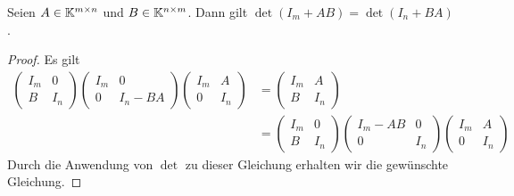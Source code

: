 \begin{thm}
	Seien $A \in \mathbb K^{m \times n}$ und $B \in \mathbb K^{n \times m}$. Dann gilt $\det(I_m + A B) = \det(I_n + B A)$. 
\end{thm} 
\begin{proof} 
	Es gilt 
	\begin{align*}
			\begin{pmatrix} I_m & 0 \\ B & I_n \end{pmatrix} \begin{pmatrix} I_m & 0 \\ 0 & I_n - B A  \end{pmatrix}  \begin{pmatrix} I_m & A \\ 0 & I_n \end{pmatrix} & = \begin{pmatrix} I_m & A \\ B & I_n \end{pmatrix} \\ & = \begin{pmatrix} I_m & 0 \\ B & I_n \end{pmatrix} \begin{pmatrix} I_m - A B  & 0 \\ 0 & I_n   \end{pmatrix}  \begin{pmatrix} I_m & A \\ 0 & I_n \end{pmatrix}
	\end{align*}
Durch die Anwendung von $\det$ zu dieser Gleichung erhalten wir die gewünschte Gleichung. 
\end{proof} 
